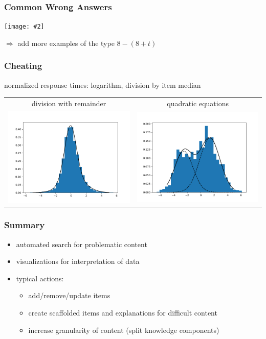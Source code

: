 \documentclass[bigger]{beamer}
\newcommand{\img}[2]{\begin{center}\texttt{[image: \#2]}\end{center}}
\begin{document}
\begin{frame}
  \frametitle{Common Wrong Answers}

  \img{1}{common-wrong}

  $\Rightarrow$ add more examples of the type $8-(8+t)$
\end{frame}


\begin{frame}
  \frametitle{Cheating}

  normalized response times: logarithm, division by item median

  \bigskip

  \begin{tabular}{cc}
    division with remainder & quadratic equations \\
    \includegraphics[width=.45\linewidth]{rt-wp-division.png} &
    \includegraphics[width=.45\linewidth]{rt-wp-kvadraticke.png} \\
  \end{tabular}
\end{frame}

\begin{frame}
  \frametitle{Summary}

  \begin{itemize}
  \item automated search for problematic content
  \item visualizations for interpretation of data
  \item typical actions:
    \begin{itemize}
    \item add/remove/update items
    \item create scaffolded items and explanations for difficult content
    \item increase granularity of content (split knowledge components)
    \end{itemize}
  \end{itemize}
\end{frame}
\end{document}
